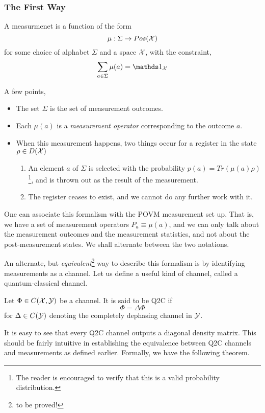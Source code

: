 \subsubsection{The First Way}
\begin{definition}
A measurmenet is a function of the form
\[\mu:\Sigma\to Pos(\mathcal{X})\]
for some choice of alphabet $\Sigma$ and a space $\mathcal{X}$, with the constraint,
\[\sum_{a\in\Sigma}\mu(a) = \iden_{\X}\]
\end{definition}
A few points,
\begin{itemize}
    \item The set $\Sigma$ is the set of measurement outcomes.
    \item Each $\mu(a)$ is a \textit{measurement operator} corresponding to the outcome $a$.
    \item When this measurement happens, two things occur for a register in the state $\rho\in D(\mathcal{X})$
    \begin{enumerate}
        \item An element $a$ of $\Sigma$ is selected with the probability $p(a) = Tr(\mu(a)\rho)$\footnote{The reader is encouraged to verify that this is a valid probability distribution.}, and is thrown out as the result of the measurement.
        \item The register ceases to exist, and we cannot do any further work with it.
    \end{enumerate}
\end{itemize}
\begin{pfact}
One can associate this formalism with the POVM measurement set up. That is, we have a set of measurement operators $P_a \equiv \mu(a)$, and we can only talk about the measurement outcomes and the measurement statistics, and not about the post-measurement states. We shall alternate between the two notations.

\end{pfact}
An alternate, but \textit{equivalent}\footnote{to be proved!} way to describe this formalism is by identifying measurements as a channel. Let us define a useful kind of channel, called a quantum-classical channel. 
\begin{definition}
Let $\Phi\in C(\mathcal{X},\mathcal{Y})$ be a channel. It is said to be Q2C if
\[\Phi = \Delta\Phi\]
for $\Delta\in C(\mathcal{Y})$ denoting the completely dephasing channel in $\mathcal{Y}$.
\end{definition}
It is easy to see that every Q2C channel outputs a diagonal density matrix. This should be fairly intuitive in establishing the equivalence between Q2C channels and measurements as defined earlier. Formally, we have the following theorem.
